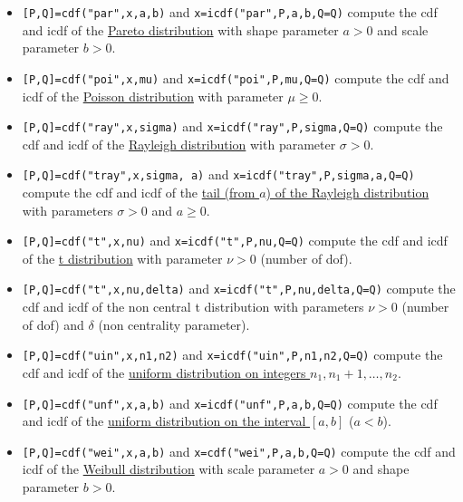 \begin{mandescription}
\begin{itemize}
\item {} \verb![P,Q]=cdf("par",x,a,b)! and  \verb!x=icdf("par",P,a,b,Q=Q)! compute the
cdf and icdf of the \hyperlink{parpdf}{Pareto  distribution} with shape parameter $a > 0$ and scale parameter $b > 0$.

\item {} \verb![P,Q]=cdf("poi",x,mu)! and \verb!x=icdf("poi",P,mu,Q=Q)! compute the
cdf and icdf of the \hyperlink{poipdf}{Poisson distribution} with parameter $\mu \ge 0$.


\item {} \verb![P,Q]=cdf("ray",x,sigma)! and \verb!x=icdf("ray",P,sigma,Q=Q)! compute
the cdf and icdf of the \hyperlink{raypdf}{Rayleigh distribution} with parameter $\sigma > 0$.

\item {} \verb![P,Q]=cdf("tray",x,sigma, a)! and \verb!x=icdf("tray",P,sigma,a,Q=Q)! compute
the cdf and icdf of the \hyperlink{traypdf}{tail (from $a$) of the Rayleigh distribution} with parameters $\sigma > 0$ 
and $a \ge 0$.

\item {} \verb![P,Q]=cdf("t",x,nu)! and \verb!x=icdf("t",P,nu,Q=Q)! compute the
cdf and icdf of the \hyperlink{tpdf}{t distribution} with parameter $\nu > 0$ (number of dof).


\item {} \verb![P,Q]=cdf("t",x,nu,delta)! and \verb!x=icdf("t",P,nu,delta,Q=Q)! compute the
cdf and icdf of the non central t distribution with parameters $\nu > 0$ (number of dof) and
$\delta$ (non centrality parameter).


\item {} \verb![P,Q]=cdf("uin",x,n1,n2)! and \verb!x=icdf("uin",P,n1,n2,Q=Q)! compute
the cdf and icdf of the \hyperlink{uinpdf}{uniform distribution on integers $n_1,n_1+1,\dots,n_2$}.

\item {} \verb![P,Q]=cdf("unf",x,a,b)!  and \verb!x=icdf("unf",P,a,b,Q=Q)! compute
the cdf and icdf of the \hyperlink{unfpdf}{uniform distribution on the interval $[a,b]$} ($a < b$).

\item {} \verb![P,Q]=cdf("wei",x,a,b)! and \verb!x=cdf("wei",P,a,b,Q=Q)! compute the
cdf and icdf of the \hyperlink{weipdf}{Weibull  distribution} with scale parameter $a > 0$ and shape parameter 
$b > 0$.

\end{itemize}

\end{mandescription}


